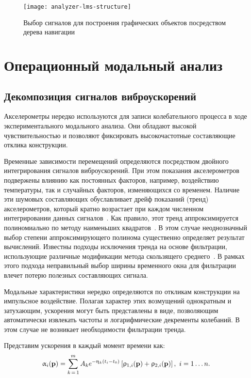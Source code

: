 \begin{figure}[H]
	\centerfloat
	\texttt{[image: analyzer-lms-structure]}
	\caption{Выбор сигналов для построения графических объектов посредством дерева навигации } \label{fig:analyzer-lms-structure}
\end{figure}

\section{Операционный модальный анализ}

\subsection{Декомпозиция сигналов виброускорений} \label{struct:accelerationDecompositionApproach}

Акселерометры нередко используются для записи колебательного процесса в ходе экспериментального модального анализа. Они обладают высокой чувствительностью и позволяют фиксировать высокочастотные составляющие отклика конструкции. 

Временные зависимости перемещений определяются посредством двойного интегрирования сигналов виброускорений. При этом показания акселерометров подвержены влиянию как постоянных факторов, например, воздействию температуры, так и случайных факторов, изменяющихся со временем. Наличие эти шумовых составляющих обуславливает дрейф показаний (тренд) акселерометров, который кратно возрастает при каждом численном интегрировании данных сигналов~\cite{lib:oma:Thong}. Как правило, этот тренд аппроксимируется полиномиально по методу наименьших квадратов~\cite{lib:oma:Gao}. В этом случае неоднозначный выбор степени аппроксимирующего полинома существенно определяет результат вычислений. Известны подходы исключения тренда на основе фильтрации, использующие различные модификации метода скользящего среднего~\cite{lib:oma:Guo}. В рамках этого подхода неправильный выбор ширины временного окна для фильтрации влечет потерю полезных составляющих сигнала.

Модальные характеристики нередко определяются по откликам конструкции на импульсное воздействие. Полагая характер этих возмущений однократным и затухающим, ускорения могут быть представлены в виде, позволяющим автоматически извлекать частоты и логарифмические декременты колебаний. В этом случае не возникает необходимости фильтрации тренда. 

Представим ускорения в каждый момент времени как:
\begin{equation}
	\upalpha_i(\mathbf{p}) = \sum\limits_{k\,=\,1} ^ m A_k e ^ {-\upeta_k (t_i - t_0)} \left[ \uprho_{1,i}(\mathbf{p}) + \uprho_{2, i}(\mathbf{p}) \right], \ i = 1 \hdots n. \label{eq:accelDecomposition}
\end{equation}

